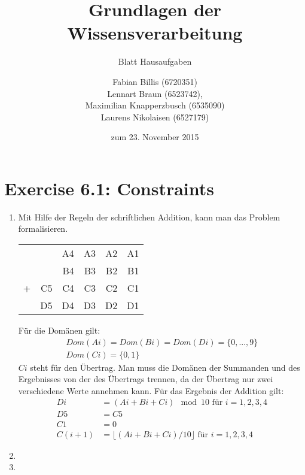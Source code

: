 \documentclass[a4paper]{scrartcl}
\title{Grundlagen der Wissensverarbeitung}
\subtitle{Blatt {\blattnr} Hausaufgaben}
\author{
    Fabian Billis (6720351) \\
    Lennart Braun (6523742), \\
    Maximilian Knapperzbusch (6535090) \\
    Laurens Nikolaisen (6527179) \\
}
\date{zum 23. November 2015}
\def \blattnr {6}
\begin{document}
\maketitle

\section*{Exercise \blattnr.1: Constraints}
\begin{enumerate}
    \item
        Mit Hilfe der Regeln der schriftlichen Addition, kann man das Problem
        formalisieren.
        \begin{center}
            \begin{tabular}{crrrrr}
                  &    & A4 & A3 & A2 & A1 \\
                  &    & B4 & B3 & B2 & B1 \\
                + & C5 & C4 & C3 & C2 & C1 \\ \hline
                  & D5 & D4 & D3 & D2 & D1
            \end{tabular}
        \end{center}
        Für die Domänen gilt:
        \begin{gather*}
            Dom(Ai) = Dom(Bi) = Dom(Di) = \{0,...,9\} \\
            Dom(Ci) = \{0,1\}
        \end{gather*}
        $Ci$ steht für den Übertrag.  Man muss die Domänen der Summanden und
        des Ergebnisses von der des Übertrags trennen, da der Übertrag nur zwei
        verschiedene Werte annehmen kann. Für das Ergebnis der Addition gilt:
        \begin{align*}
            Di &= (Ai + Bi + Ci) \mod 10 \text{ für } i = 1,2,3,4 \\
            D5 &= C5 \\
            C1 &= 0 \\
            C(i+1) &= \lfloor (Ai + Bi + Ci) / 10 \rfloor
            \text{ für }  i = 1,2,3,4
        \end{align*}
	   
    \item

    \item

\end{enumerate}
\end{document}
